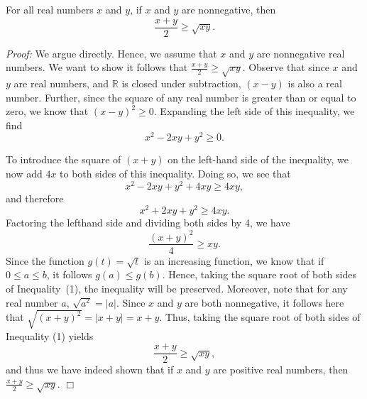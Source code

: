 \documentclass[12pt]{article}
\begin{document}
\bigskip

  For all real numbers $x$ and $y$, if  $x$  and  $y$  are nonnegative, then   
$$\frac{x+y}{2} \ge \sqrt{xy}.$$

\noindent \emph{Proof:}  We argue directly.  Hence, we assume that  $x$  and  $y$  are nonnegative real numbers.  We want to show it follows that $\frac{x+y}{2} \ge \sqrt{xy}.$  Observe that since $x$ and $y$ are real numbers, and $\mathbb{R}$ is closed under subtraction, $(x-y)$ is also a real number.  Further, since the square of any real number is greater than or equal to zero, we know that $(x-y)^2 \ge 0$.  Expanding the left side of this inequality,  we find
$$x^2 - 2xy + y^2 \ge 0.$$

To introduce the square of $(x+y)$ on the left-hand side of the inequality, we now add $4x$ to both sides of this inequality.   Doing so, we see that
$$x^2 - 2xy + y^2 + 4xy \ge 4xy,$$
and therefore
$$x^2 + 2xy + y^2 \ge 4xy.$$
Factoring the lefthand side and dividing both sides by 4, we have
\begin{equation} \label{Eq1}
\frac{(x+y)^2}{4} \ge xy.
\end{equation}
Since the function $g(t) = \sqrt{t}$ is an increasing function, we know that if $0 \le a \le b$, it follows $g(a) \le g(b)$.  Hence, taking the square root of both sides of Inequality~(1), the inequality will be preserved.  Moreover, note that for any real number $a$, $\sqrt{a^2} = |a|$.  Since $x$ and $y$ are both nonnegative, it follows here that $\sqrt{(x+y)^2} = |x+y| = x + y$.  Thus, taking the square root of both sides of Inequality (1) yields
$$\frac{x+y}{2} \ge \sqrt{xy},$$
and thus we have indeed shown that if  $x$  and  $y$  are positive  real numbers, then  $\frac{x+y}{2} \ge \sqrt{xy}.$
\hfill $\Box$
\end{document}
